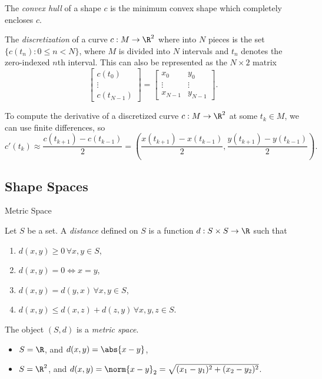 \documentclass[12pt]{article}
\begin{document}
\begin{defn}
    The \emph{convex hull} of a shape $c$ is the minimum convex shape which completely encloses $c$.
\end{defn}

\begin{defn}
    The \emph{discretization} of a curve $c: M \to \R^2$ where into $N$ pieces is the set $\{c(t_n) : 0 \leq n < N\}$, where $M$ is divided into $N$ intervals and $t_n$ denotes the zero-indexed $n$th interval. This can also be represented as the $N \times 2$ matrix
    \[\begin{bmatrix}
        c(t_0) \\ \vdots \\ c(t_{N-1})
    \end{bmatrix} = \begin{bmatrix}
        x_0 & y_0 \\ \vdots & \vdots \\ x_{N-1} & y_{N-1}
    \end{bmatrix}.\]
\end{defn}

To compute the derivative of a discretized curve $c: M \to \R^2$ at some $t_k \in M$, we can use finite differences, so \[c'(t_k) \approx \frac{c(t_{k+1})- c(t_{k-1})}{2} = \left(\frac{x(t_{k+1}) - x(t_{k-1})}{2}, \frac{y(t_{k+1}) - y(t_{k-1})}{2}\right).\]

\subsection{Shape Spaces}

\begin{defn} Metric Space

    Let $S$ be a set. A \emph{distance} defined on $S$ is a function $d: S \times S \to \R$ such that
    \begin{enumerate}
        \item $d(x, y) \geq 0 \,\forall x, y \in S$,
        \item $d(x, y) = 0 \iff x = y$,
        \item $d(x, y) = d(y, x) \,\forall x, y \in S$,
        \item $d(x, y) \leq d(x, z) + d(z, y) \,\forall x, y, z \in S$.
    \end{enumerate}
    The object $(S, d)$ is a \emph{metric space}.
\end{defn}

\begin{exmp}\proofbreak
    \begin{itemize}
        \item $S = \R$, and $d(x, y) = \abs{x - y}$,
        \item $S = \R^2$, and $d(x, y) = \norm{x - y}_2 = \sqrt{(x_1-y_1)^2+(x_2-y_2)^2}$.
    \end{itemize}
\end{exmp}
\end{document}
